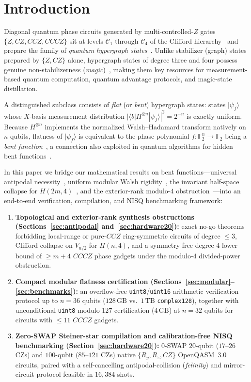 \documentclass[11pt,a4paper]{article}
\newcommand{\F}{\mathbb{F}}
\newcommand{\ket}[1]{|#1\rangle}
\newcommand{\bra}[1]{\langle#1|}
\begin{document}
\section{Introduction}
Diagonal quantum phase circuits generated by multi-controlled-$Z$ gates $\{Z, CZ, CCZ, CCCZ\}$ sit at levels $\mathcal{C}_1$ through $\mathcal{C}_4$ of the Clifford hierarchy~\cite{Gottesman1999,Cui2017} and prepare the family of \emph{quantum hypergraph states}~\cite{Rossi2013,Qu2013,Gachechiladze2019}. Unlike stabilizer (graph) states prepared by $\{Z, CZ\}$ alone, hypergraph states of degree three and four possess genuine non-stabilizerness (\emph{magic})~\cite{Leone2022}, making them key resources for measurement-based quantum computation, quantum advantage protocols, and magic-state distillation.

A distinguished subclass consists of \emph{flat} (or \emph{bent}) hypergraph states: states $\ket{\psi_f}$ whose $X$-basis measurement distribution $|\bra{b}H^{\otimes n}\ket{\psi_f}|^2 = 2^{-n}$ is exactly uniform. Because $H^{\otimes n}$ implements the normalized Walsh--Hadamard transform natively on $n$ qubits, flatness of $\ket{\psi_f}$ is equivalent to the phase polynomial $f:\F_2^n\to\F_2$ being a \emph{bent function}~\cite{Carlet2021}, a connection also exploited in quantum algorithms for hidden bent functions~\cite{Rotteler2010}.

In this paper we bridge our mathematical results on bent functions---universal antipodal necessity~\cite{Vono2026Antipodal}, uniform modular Walsh rigidity~\cite{Vono2026Rigidity}, the invariant half-space collapse for $H(2m,4)$~\cite{Vono2026H12}, and the exterior-rank modulo-$4$ obstruction~\cite{Vono2026Exterior}---into an end-to-end verification, compilation, and NISQ benchmarking framework:
\begin{enumerate}
  \item \textbf{Topological and exterior-rank synthesis obstructions (Sections~\ref{sec:antipodal} and~\ref{sec:hardware20}):} exact no-go theorems forbidding local-range or pure-$CCZ$ ring-symmetric circuits of degree $\le 3$, Clifford collapse on $V_{n/2}$ for $H(n,4)$, and a symmetry-free degree-$4$ lower bound of $\ge m+4$ $CCCZ$ phase gadgets under the modulo-$4$ divided-power obstruction.
  \item \textbf{Compact modular flatness certification (Sections~\ref{sec:modular}--\ref{sec:benchmarks}):} an overflow-free \texttt{uint8}/\texttt{uint16} arithmetic verification protocol up to $n=36$ qubits ($128\,\text{GB}$ vs.\ $1\,\text{TB}$ \texttt{complex128}), together with unconditional \texttt{uint8} modulo-$127$ certification ($4\,\text{GB}$) at $n=32$ qubits for circuits with $\le 11$ $CCCZ$ gadgets.
  \item \textbf{Zero-SWAP Steiner-star compilation and calibration-free NISQ benchmarking (Section~\ref{sec:hardware20}):} $0$-SWAP $20$-qubit ($17$--$26$ CZs) and $100$-qubit ($85$--$121$ CZs) native $\{R_y, R_z, CZ\}$ OpenQASM~3.0 circuits, paired with a self-cancelling antipodal-collision (\emph{felinity}) and mirror-circuit protocol feasible in $16{,}384$ shots.
\end{enumerate}
\end{document}

